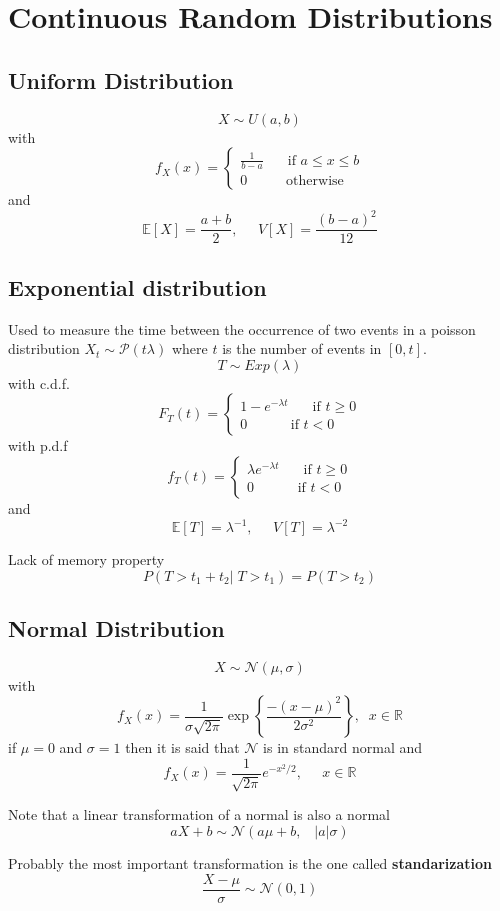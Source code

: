 
\section{Continuous Random Distributions}
\subsection{Uniform Distribution}
\[ X \sim U(a,b) \] with
\[f_X(x)=
    \begin{cases}
        \frac{1}{b-a}\;\;\;\;\;\text{ if } a\leq x \leq b\\
        0\;\;\;\;\;\;\;\;\;\;\text{otherwise}
    \end{cases}
\] and
\[ \mathbb{E}[X]=\frac{a+b}{2},\;\;\;\;\;V[X]=\frac{(b-a)^2}{12} \]

\subsection{Exponential distribution}
Used to measure the time between the occurrence of two events in a poisson
distribution $X_t\sim\mathcal{P}(t\lambda)$ where $t$ is the number of events in
$[0,t]$.
\[ T \sim Exp(\lambda) \] with c.d.f.
\[F_T(t)=
    \begin{cases}
        1-e^{-\lambda t}\;\;\;\;\;\text{ if } t\geq 0\\
        0\;\;\;\;\;\;\;\;\;\;\text{ if } t<0
    \end{cases}
\] with p.d.f
\[f_T(t)=
    \begin{cases}
        \lambda e^{-\lambda t}\;\;\;\;\;\text{ if } t\geq 0\\
        0\;\;\;\;\;\;\;\;\;\;\text{ if } t<0
    \end{cases}
\] and
\[ \mathbb{E}[T]=\lambda^{-1},\;\;\;\;\;V[T]=\lambda^{-2} \]
\begin{tcolorbox}
    Lack of memory property
    \[ P(T>t_1 + t_2 |\;T>t_1) = P(T>t_2) \]
\end{tcolorbox}

\subsection{Normal Distribution}
\[ X \sim \mathcal{N}(\mu,\sigma) \] with
\[
f_X(x)=\frac{1}{\sigma\sqrt{2\pi}}\exp\left\{\frac{-(x-\mu)^2}{2\sigma^2}\right\},\;\;
x\in\mathbb{R} \] 
if $\mu=0$ and $\sigma=1$ then it is said that $\mathcal{N}$ is in standard
normal and
\[ f_X(x)=\frac{1}{\sqrt{2\pi}}e^{-x^2/2},\;\;\;\;\; x\in\mathbb{R} \]
\begin{tcolorbox}
    Note that a linear transformation of a normal is also a normal
    \[aX+b \sim \mathcal{N}(a\mu+b,\;\;\;|a|\sigma)\]
\end{tcolorbox}
\begin{tcolorbox}
    Probably the most important transformation is the one called
    \textbf{standarization}
    \[\frac{X-\mu}{\sigma}\sim\mathcal{N}(0,1)\]
\end{tcolorbox}

